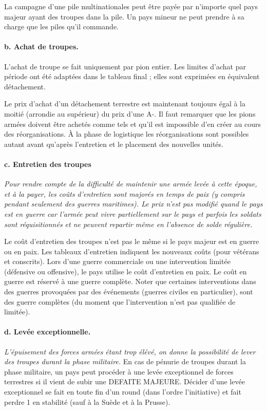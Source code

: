 La campagne d'une pile multinationales peut être payée par 
n'importe quel pays majeur ayant des troupes dans la pile. Un
pays mineur ne peut prendre à sa charge que les piles
qu'il commande.

\paragraph{b. Achat de troupes.}
L'achat de troupe se fait uniquement par pion entier. Les limites d'achat par période 
ont été adaptées dans le tableau final ;
elles sont exprimées en équivalent détachement. 

Le prix d'achat d'un détachement terrestre est maintenant toujours égal
à la moitié (arrondie au supérieur) du prix d'une A-.
Il faut remarquer que les pions
armées doivent être achetés comme tels et qu'il est impossible d'en créer
au cours des réorganisations. À la phase de logistique les réorganisations sont
possibles autant avant qu'après l'entretien et le placement des nouvelles unités.


\paragraph{c. Entretien des troupes}
\textit{
Pour rendre compte de la difficulté de maintenir une armée levée 
à cette époque, et à la payer, les coûts d'entretien sont majorés en
temps de paix (y compris pendant seulement des guerres
maritimes). Le prix n'est pas modifié quand le pays est en guerre
car l'armée peut vivre partiellement sur le pays et parfois les soldats
sont réquisitionnés et ne peuvent repartir même en l'absence de
solde régulière.}

Le coût d'entretien des troupes n'est pas le même si le
pays majeur est en guerre ou en paix. Les tableaux d'entretien
indiquent les nouveaux coûts (pour vétérans et conscrits).
Lors d'une guerre commerciale ou une intervention limitée (défensive
ou offensive), le pays utilise le coût d'entretien en paix. Le
coût en guerre est réservé à une guerre complète. Noter que
certaines interventions dans des guerres provoquées par
des événements (guerres civiles en particulier), sont des
guerre complètes (du moment que l'intervention n'est pas
qualifiée de limitée).


\paragraph{d. Levée exceptionnelle.}
\textit{
L'épuisement des forces armées étant trop élévé, on donne la 
possibilité de lever des troupes durant la phase militaire.}
En cas de pénurie de troupes durant la phase militaire, un
pays peut procéder à une levée exceptionnel de forces
terrestres si il vient de subir une DEFAITE MAJEURE. 
Décider d'une levée exceptionnel se fait en toute 
fin d'un round (dans l'ordre l'initiative) et fait perdre 1 en stabilité
(sauf à la Suède et à la Prusse).

